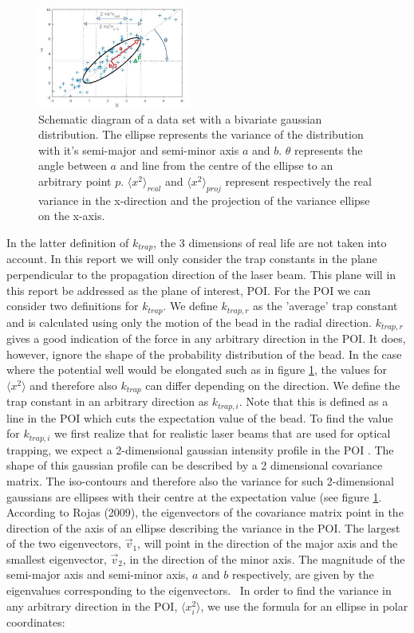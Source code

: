 \begin{figure}
    \centering
    \includegraphics[width=0.45\textwidth,keepaspectratio]{figures/ellips.jpg}
    \caption{Schematic diagram of a data set with a bivariate gaussian distribution. The ellipse represents the variance of the distribution with it's semi-major and semi-minor axis $a$ and $b$. $\theta$ represents the angle between $a$ and line from the centre of the ellipse to an arbitrary point $p$. $\langle x^2 \rangle _{real}$ and $\langle x^2 \rangle _{proj}$ represent respectively the real variance in the x-direction and the projection of the variance ellipse on the x-axis.}
    \label{fig_ellipse}
\end{figure}

In the latter definition of $k_{trap}$, the 3 dimensions of real life are not taken into account. In this report we will only consider the trap constants in the plane perpendicular to the propagation direction of the laser beam. This plane will in this report be addressed as the plane of interest, POI. For the POI we can consider two definitions for $k_{trap}$. We define $k_{trap,r}$ as the 'average' trap constant and is calculated using only the motion of the bead in the radial direction. $k_{trap,r}$ gives a good indication of the force in any arbitrary direction in the POI. It does, however, ignore the shape of the probability distribution of the bead. In the case where the potential well would be elongated such as in figure \ref{fig_ellipse}, the values for $ \langle x^2 \rangle $ and therefore also $k_{trap}$ can differ depending on the direction. We define the trap constant in an arbitrary direction as $k_{trap,i}$. Note that this is defined as a line in the POI which cuts the expectation value of the bead. To find the value for $k_{trap,i}$ we first realize that for realistic laser beams that are used for optical trapping, we expect a 2-dimensional gaussian intensity profile in the POI \cite{sheavitz}. The shape of this gaussian profile can be described by a 2 dimensional covariance matrix. The iso-contours and therefore also the variance for such 2-dimensional gaussians are ellipses with their centre at the expectation value \cite{chuong} (see figure \ref{fig_ellipse}. According to Rojas (2009), the eigenvectors of the covariance matrix point in the direction of the axis of an ellipse describing the variance in the POI. The largest of the two eigenvectors, $\vec{v}_1$, will point in the direction of the major axis and the smallest eigenvector, $\vec{v}_2$, in the direction of the minor axis. The magnitude of the semi-major axis and semi-minor axis, $a$ and $b$ respectively, are given by the eigenvalues corresponding to the eigenvectors.\cite{rojas} \
In order to find the variance in any arbitrary direction in the POI,  $ \langle x_i^2 \rangle$, we use the formula for an ellipse in polar coordinates:

